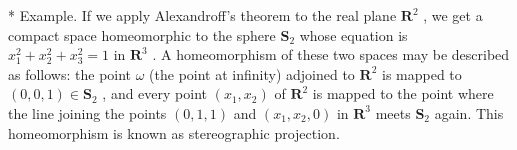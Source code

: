 * Example. If we apply Alexandroff's theorem to the real plane \(\mathbf{R}^2\) , we get a compact space homeomorphic to the sphere \(\mathbf{S}_2\) whose equation is \(x_1^2 + x_2^2 + x_3^2 = 1\) in \(\mathbf{R}^3\) . A homeomorphism of these two spaces may be described as follows: the point \(\omega\) (the point at infinity) adjoined to \(\mathbf{R}^2\) is mapped to \((0, 0, 1) \in \mathbf{S}_2\) , and every point \((x_1, x_2)\) of \(\mathbf{R}^2\) is mapped to the point where the line joining the points \((0, 1, 1)\) and \((x_1, x_2, 0)\) in \(\mathbf{R}^3\) meets \(\mathbf{S}_2\) again. This homeomorphism is known as stereographic projection.

